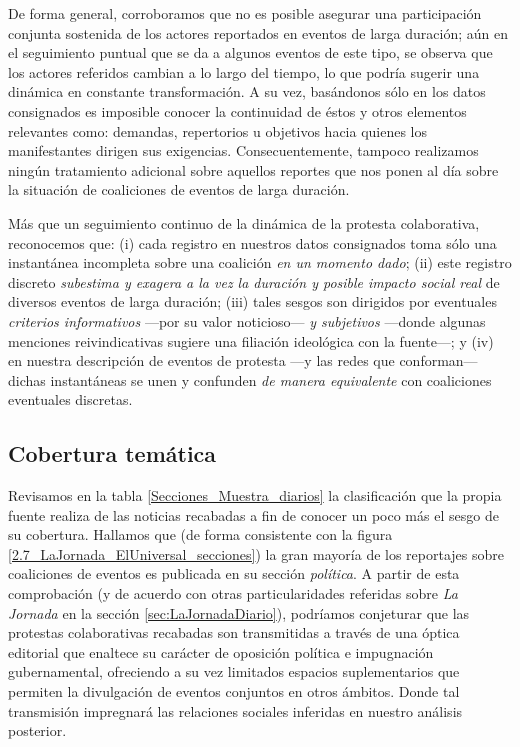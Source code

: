 \documentclass[letterpaper, 11pt]{book}
\theoremstyle{definition}
\theoremstyle{remark}
\begin{document}
De forma general, corroboramos que no es posible asegurar una participación conjunta sostenida de los actores reportados en eventos de larga duración; aún en el seguimiento puntual que se da a algunos eventos de este tipo, se observa que los actores referidos cambian a lo largo del tiempo, lo que podría sugerir una dinámica en constante transformación. 
A su vez, basándonos sólo en los datos consignados es imposible conocer la continuidad de éstos y otros elementos relevantes como: demandas, repertorios u objetivos hacia quienes los manifestantes dirigen sus exigencias. 
Consecuentemente, tampoco realizamos ningún tratamiento adicional sobre aquellos reportes que nos ponen al día sobre la situación de coaliciones de eventos de larga duración. 


Más que un seguimiento continuo de la dinámica de la protesta colaborativa, reconocemos que: 
(i) cada registro en nuestros datos consignados toma sólo una instantánea incompleta sobre una coalición \emph{en un momento dado}; 
(ii) este registro discreto \emph{subestima y exagera a la vez la duración y posible impacto social real} de diversos eventos de larga duración; 
(iii) tales sesgos son dirigidos por eventuales \emph{criterios informativos} ---por su valor noticioso--- \emph{y subjetivos} ---donde algunas menciones reivindicativas sugiere una filiación ideológica con la fuente---; 
y (iv) en nuestra descripción de eventos de protesta ---y las redes que conforman--- dichas instantáneas se unen y confunden \emph{de manera equivalente} con coaliciones eventuales discretas. 







\subsection{Cobertura temática}
\label{sec:cobertura_temas}

Revisamos en la tabla \ref{Secciones_Muestra_diarios} la clasificación que la propia fuente realiza de las noticias recabadas a fin de conocer un poco más el sesgo de su cobertura. 
Hallamos que (de forma consistente con la figura \ref{2.7_LaJornada_ElUniversal_secciones}) la gran mayoría de los reportajes sobre coaliciones de eventos es publicada en su sección \emph{política}.  
A partir de esta comprobación (y de acuerdo con otras particularidades referidas sobre \emph{La Jornada} en la sección \ref{sec:LaJornadaDiario}), podríamos conjeturar que las protestas colaborativas recabadas son transmitidas a través de una óptica editorial que enaltece su carácter de oposición política e impugnación gubernamental, ofreciendo a su vez limitados espacios suplementarios que permiten la divulgación de eventos conjuntos en otros ámbitos. 
Donde tal transmisión impregnará las relaciones sociales inferidas en nuestro análisis posterior. 
\end{document}
